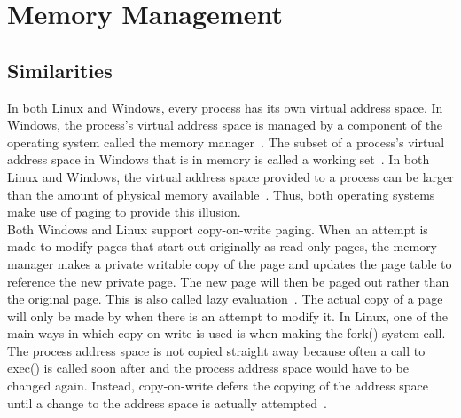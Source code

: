 \documentclass[letterpaper,10pt,titlepage]{article}
\begin{document}
\section{Memory Management}
\subsection{Similarities}
In both Linux and Windows, every process has its own virtual address space.
In Windows, the process's virtual address space is managed by a component
of the operating system called the memory manager~\cite{rsw7}. The subset of a process's
virtual address space in Windows that is in memory is called a working set~\cite{tm11}.
In both Linux and Windows, the virtual address space provided to a process
can be larger than the amount of physical memory available~\cite{12}. Thus, both 
operating systems make use of paging to provide this illusion.
\\
\linebreak
Both Windows and Linux support copy-on-write paging. When an attempt is made
to modify pages that start out originally as read-only pages, the memory 
manager makes a private writable copy of the page and updates the page table 
to reference the new private page. The new page will then be paged out rather
than the original page. This is also called lazy evaluation~\cite{rsw7}. The actual copy
of a page will only be made by when there is an attempt to modify it. In 
Linux, one of the main ways in which copy-on-write is used is when making the
fork() system call. The process address space is not copied straight away 
because often a call to exec() is called soon after and the process address
space would have to be changed again. Instead, copy-on-write defers the 
copying of the address space until a change to the address space is actually 
attempted~\cite{tm10}.
\end{document}
